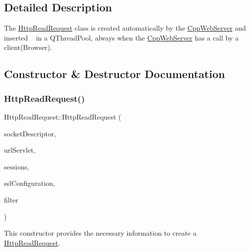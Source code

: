 \subsection{Detailed Description}
The \mbox{\hyperlink{class_http_read_request}{Http\+Read\+Request}} class is created automatically by the \mbox{\hyperlink{class_cpp_web_server}{Cpp\+Web\+Server}} and inserted ~\newline
 in a Q\+Thread\+Pool, always when the \mbox{\hyperlink{class_cpp_web_server}{Cpp\+Web\+Server}} has a call by a client(\+Browser). 

\subsection{Constructor \& Destructor Documentation}
\mbox{\label{class_http_read_request_ae585e99b43ee991c3b4884a1852eeb82}} 
\subsubsection{\texorpdfstring{Http\+Read\+Request()}{HttpReadRequest()}}
{\footnotesize\ttfamily Http\+Read\+Request\+::\+Http\+Read\+Request (\begin{DoxyParamCaption}\item[{qintptr}]{socket\+Descriptor,  }\item[{\mbox{\hyperlink{class_q_map_thread_safety}{Q\+Map\+Thread\+Safety}}$<$ Q\+String, \mbox{\hyperlink{class_http_servlet}{Http\+Servlet}} $\ast$$>$ \&}]{url\+Servlet,  }\item[{\mbox{\hyperlink{class_q_map_thread_safety}{Q\+Map\+Thread\+Safety}}$<$ Q\+String, \mbox{\hyperlink{class_http_session}{Http\+Session}} $\ast$$>$ \&}]{sessions,  }\item[{Q\+Ssl\+Configuration $\ast$}]{ssl\+Configuration,  }\item[{\mbox{\hyperlink{class_filter}{Filter}} $\ast$}]{filter }\end{DoxyParamCaption})}



This constructor provides the necessary information to create a \mbox{\hyperlink{class_http_read_request}{Http\+Read\+Request}}. 


